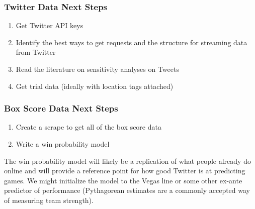 \documentclass[12pt]{article}
\begin{document}
\subsubsection*{Twitter Data Next Steps}
\begin{enumerate}
	\item Get Twitter API keys
	\item Identify the best ways to get requests and the structure for streaming data from Twitter
	\item Read the literature on sensitivity analyses on Tweets
	\item Get trial data (ideally with location tags attached)
\end{enumerate}

\subsubsection*{Box Score Data Next Steps}
\begin{enumerate}
	\item Create a scrape to get all of the box score data
	\item Write a win probability model
\end{enumerate}

\noindent
The win probability model will likely be a replication of what people already do online and will provide a reference point for how good Twitter is at predicting games. We might initialize the model to the Vegas line or some other ex-ante predictor of performance (Pythagorean estimates are a commonly accepted way of measuring team strength). 
\end{document}

